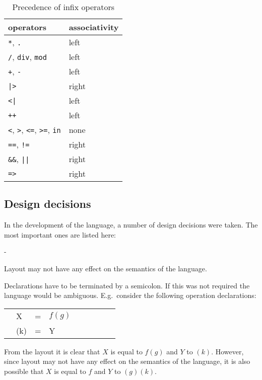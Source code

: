 \documentclass[a4paper,fleqn]{article}
\makeatletter
\newenvironment{tdefinitions}[2][0.15em]
  {\begin{list}%
    {#2}%
    {\setlength{\parsep}{0pt}%
     \setlength{\itemsep}{#1}%
     \setlength{\leftmargin}{\mathindent}%
     \setlength{\labelwidth}{\mathindent - \labelsep}%
    }
  }
  {\end{list}}
\newcommand{\frm}[1]{\mbox{\ensuremath{#1}}}
\newcommand{\f}[1]{\ensuremath{\mathit{#1}}}
\newcommand{\fa}[2]{\ensuremath{\f{#1}(#2)}}
\newlength{\tlength}
\newenvironment{mCRL2}%
{\par\bigskip\noindent%
 \begin{tabular}{@{}>{\bf}p{2.3em}L@{\ }L@{\ }L@{\ }L@{\ }L@{\ }L@{\ }L@{\ }L}%
}%
{\end{tabular}\bigskip\par%
}
\makeatother
\begin{document}
\begin{table}[!hbt]
\centering
\begin{tabular}{|ll|}
\hline
operators                                           & associativity\\\hline
\verb+*+, \verb+.+                                  & left\\
\verb+/+, \verb+div+, \verb+mod+                    & left\\
\verb-+-, \verb+-+                                  & left\\
\verb+|>+                                           & right\\
\verb+<|+                                           & left\\
\verb-++-                                           & left\\
\verb+<+, \verb+>+, \verb+<=+, \verb+>=+, \verb+in+ & none\\
\verb+==+, \verb+!=+                                & right\\
\verb+&&+, \verb+||+                                & right\\
\verb+=>+                                           & right\\\hline
\end{tabular}
\caption{Precedence of infix operators}
\label{tab:precedence}
\end{table}

\subsection{Design decisions}

In the development of the language, a number of design decisions were taken.
The most important ones are listed here:
\begin{tdefinitions}{-}
\item Layout may not have any effect on the semantics of the language.
\item Declarations have to be terminated by a semicolon. If this was not
required the language would be ambiguous. E.g.\ consider the following
operation declarations:
\begin{mCRL2}
& X   & = & \fa{f}{g}\\
& (k) & = & Y\\
\end{mCRL2}
From the layout it is clear that \frm{X} is equal to \frm{\fa{f}{g}} and
\frm{Y} to \frm{(k)}. However, since layout may not have any effect on the
semantics of the language, it is also possible that \frm{X} is equal to
\frm{f} and \frm{Y} to \frm{\fa{(g)}{k}}.
\end{tdefinitions}
\end{document}
